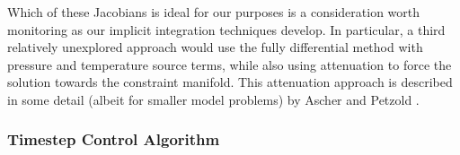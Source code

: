 Which of these Jacobians is ideal for our purposes is a consideration worth
monitoring as our implicit integration techniques develop. In particular, 
a third relatively unexplored approach would use the fully differential
method with pressure and temperature source terms, while also using attenuation
to force the solution towards the constraint manifold. This attenuation approach
is described in some detail (albeit for smaller model problems) by Ascher and
Petzold \cite{ascher1998computer}.

\subsubsection{Timestep Control Algorithm}


